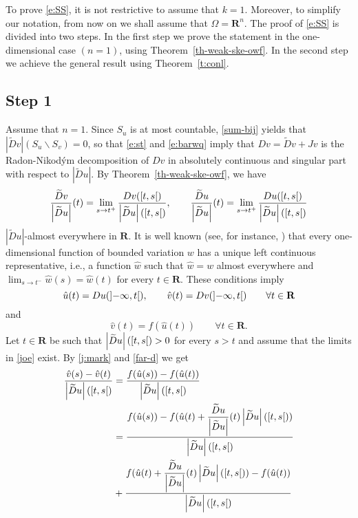 \documentclass{article}
\theoremstyle{definition}
\theoremstyle{remark}
\newcommand{\thmref}[1]{Theorem~\ref{#1}}
\newcommand{\wt}{\widetilde}
\newcommand{\interval}[1]{\mathinner{#1}}
\newcommand{\envert}[1]{\left\lvert#1\right\rvert}
\let\abs=\envert
\begin{document}
To prove \eqref{e:SS}, it is not restrictive to assume that $k=1$.
Moreover, to simplify our notation, from now on we shall assume that
$\Omega = \mathbf{R}^n$. The proof of \eqref{e:SS} is divided into two
steps. In the first step we prove the statement in the one-dimensional
case $(n=1)$, using \thmref{th-weak-ske-owf}. In the second step we
achieve the general result using \thmref{t:conl}.

\subsection*{Step 1}
Assume that $n=1$. Since $S_u$ is at most countable, \eqref{sum-bij}
yields that $\abs{\wt{D}v}(S_u\backslash S_v)=0$, so that
\eqref{e:st} and \eqref{e:barwq} imply that $Dv=\wt{D}v+Jv$ is
the Radon-Nikod\'ym decomposition of $Dv$ in absolutely continuous and
singular part with respect to $\abs{\wt{D} u}$. By
\thmref{th-weak-ske-owf}, we have
\begin{equation*}
\frac{\wt{D}v}{\abs{\wt{D}u}}(t)=\lim_{s\to t^+}
\frac{Dv(\interval{\left[t,s\right[})}
{\abs{\wt{D}u}(\interval{\left[t,s\right[})},\qquad
\frac{\wt{D}u}{\abs{\wt{D}u}}(t)=\lim_{s\to t^+}
\frac{Du(\interval{\left[t,s\right[})}
{\abs{\wt{D}u}(\interval{\left[t,s\right[})}
\end{equation*}
$\abs{\wt{D}u}$-almost everywhere in $\mathbf{R}$. It is well known
(see, for instance, \cite[2.5.16]{ste:sint}) that every one-dimensional
function of bounded variation $w$ has a unique left continuous
representative, i.e., a function $\hat w$ such that $\hat w=w$ almost
everywhere and $\lim_{s\to t^-}\hat w(s)=\hat w(t)$ for every $t\in
\mathbf{R}$. These conditions imply
\begin{equation}
\hat u(t)=Du(\interval{\left]-\infty,t\right[}),
\qquad \hat v(t)=Dv(\interval{\left]-\infty,t\right[})\qquad
\forall t\in\mathbf{R}
\end{equation}
and
\begin{equation}\label{alimo}
\hat v(t)=f(\hat u(t))\qquad\forall t\in\mathbf{R}.\end{equation}
Let $t\in\mathbf{R}$ be such that
$\abs{\wt{D}u}(\interval{\left[t,s\right[})>0$ for every $s>t$ and
assume that the limits in \eqref{joe} exist. By \eqref{j:mark} and
\eqref{far-d} we get
\begin{equation*}\begin{split}
\frac{\hat v(s)-\hat
v(t)}{\abs{\wt{D}u}(\interval{\left[t,s\right[})}&=\frac {f(\hat
u(s))-f(\hat u(t))}{\abs{\wt{D}u}(\interval{\left[t,s\right[})}\\
&=\frac{f(\hat u(s))-f(\hat
u(t)+\dfrac{\wt{D}u}{\abs{\wt{D}u}}(t)\abs{\wt{D}u
}(\interval{\left[t,s\right[}))}%
{\abs{\wt{D}u}(\interval{\left[t,s\right[})}\\
&+\frac
{f(\hat u(t)+\dfrac{\wt{D}u}{\abs{\wt{D}u}}(t)\abs{\wt{D}
u}(\interval{\left[t,s\right[}))-f(\hat
u(t))}{\abs{\wt{D}u}(\interval{\left[t,s\right[})}
\end{split}\end{equation*}
\end{document}
